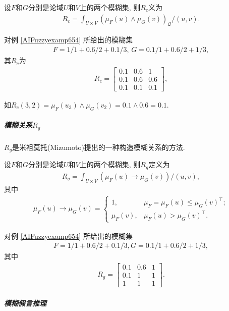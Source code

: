 设$F$和$G$分别是论域$U$和$V$上的两个模糊集, 则$R_c$义为
\begin{align*}
  R_{c}=\int_{U \times V}\left(\mu_{F}(u) \wedge \mu_{G}(v)\right)_{\mathcal{Q}} /(u, v).
\end{align*}
\begin{example}
对例 \ref{AIFuzzyexamp654} 所给出的模糊集
\begin{align*}
    F=1/1+0.6/2+0.1/3,\, G=0.1/1+0.6/2+1/3,
\end{align*}
其$R_c$为
\begin{align*}
    R_{c}=\left[\begin{array}{ccc}{0.1} & {0.6} & {1} \\
    {0.1} & {0.6} & {0.6} \\ {0.1} & {0.1} & {0.1}\end{array}\right],
\end{align*}
\vspace{-0.2cm}
\end{example}
如$R_{c}(3,2)=\mu_{F}\left(u_{3}\right) \wedge \mu_{G}\left(v_{2}\right)=0.1 \wedge 0.6=0.1$.
\subparagraph{模糊关系$R_g$}
$R_g$是米祖莫托(Mizumoto)提出的一种构造模糊关系的方法.

设$F$和$G$分别是论域$U$和$V$上的两个模糊集, 则$R_g$定义为
\begin{align*}
    R_{g}=\int_{U \times V}\left(\mu_{F}(u) \rightarrow \mu_{G}(v)\right) /(u, v),
\end{align*}
其中
\begin{align*}
  \mu_{F}(u) \rightarrow \mu_{G}(v)=
  \left\{
  \begin{array}{ll}
  {1}, & \mu_{F}= \mu_{F}(u) \leq \mu_{G}(v)^{\top};\\
  \mu_{F}(v), &  \mu_{F}(u)>\mu_{G}(v) ^{\top}.
  \end{array}
  \right.
\end{align*}
\begin{example}
对例 \ref{AIFuzzyexamp654} 所给出的模糊集
\begin{align*}
    F=1/1+0.6/2+0.1/3, G=0.1/1+0.6/2+1/3,
\end{align*}
其中
\begin{align*}
    R_{g}=\left[
    \begin{array}{ccc}
    {0.1} & {0.6} & {1} \\
    {0.1} & {1} & {1} \\
    {1} & {1} & {1}
    \end{array}\right].
\end{align*}
\vspace{-0.3cm}
\end{example}
\subparagraph{模糊假言推理}
